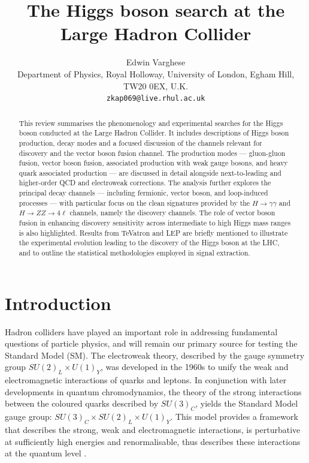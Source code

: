 \documentclass[a4paper,11pt]{article}
\title{\textbf{The Higgs boson search at the Large Hadron Collider}}
\author{
	Edwin Varghese\\[10pt]
	\small Department of Physics, Royal Holloway, University of London, Egham Hill, TW20 0EX, U.K.\\
	\texttt{\small zkap069@live.rhul.ac.uk}
}
\date{}
\begin{document}
	
	\maketitle
	
	\begin{abstract}
		This review summarises the phenomenology and experimental searches for the Higgs boson conducted at the Large Hadron Collider. It includes descriptions of Higgs boson production, decay modes and a focused discussion of the channels relevant for discovery and the vector boson fusion channel. The production modes --- gluon-gluon fusion, vector boson fusion, associated production with weak gauge bosons, and heavy quark associated production --- are discussed in detail alongside next-to-leading and higher-order QCD and electroweak corrections. The analysis further explores the principal decay channels --- including fermionic, vector boson, and loop-induced processes --- with particular focus on the clean signatures provided by the $ H \rightarrow \gamma \gamma$ and $H \rightarrow ZZ \rightarrow 4 \ell$ channels, namely the discovery channels. The role of vector boson fusion in enhancing discovery sensitivity across intermediate to high Higgs mass ranges is also highlighted. Results from TeVatron and LEP are briefly mentioned to illustrate the experimental evolution leading to the discovery of the Higgs boson at the LHC, and to outline the statistical methodologies employed in signal extraction.
		
		
	\end{abstract}
	
	
	\newpage
	\tableofcontents
	\vspace{-5pt}
	\newpage

	
	\section{Introduction} 

Hadron colliders have played an important role in addressing fundamental questions of particle physics, and will remain our primary source for testing the Standard Model (SM). The electroweak theory, described by the gauge symmetry group $SU(2)_L \times U(1)_Y$, was developed in the 1960s to unify the weak and electromagnetic interactions of quarks and leptons. In conjunction with later developments in quantum chromodynamics, the theory of the strong interactions between the coloured quarks described by $SU(3)_C$, yields the Standard Model gauge group: $SU(3)_C \times SU(2)_L \times U(1)_Y$. This model provides a framework that describes the strong, weak and electromagnetic interactions, is perturbative at sufficiently high energies and renormalisable, thus describes these interactions at the quantum level \cite{Djouadi:2005gi}.\\ 
\end{document}
